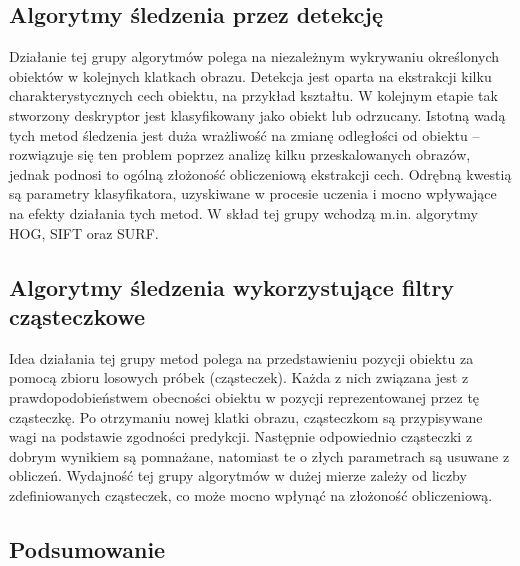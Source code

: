 \subsection{Algorytmy śledzenia przez detekcję}
Działanie tej grupy algorytmów polega na niezależnym wykrywaniu określonych obiektów w kolejnych klatkach obrazu. Detekcja jest oparta na ekstrakcji kilku charakterystycznych cech obiektu, na przykład kształtu. W kolejnym etapie tak stworzony deskryptor jest klasyfikowany jako obiekt lub odrzucany. Istotną wadą tych metod śledzenia jest duża wrażliwość na zmianę odległości od obiektu -- rozwiązuje się ten problem poprzez analizę kilku przeskalowanych obrazów, jednak podnosi to ogólną złożoność obliczeniową ekstrakcji cech. Odrębną kwestią są parametry klasyfikatora, uzyskiwane w procesie uczenia i mocno wpływające na efekty działania tych metod.
W skład tej grupy wchodzą m.in. algorytmy HOG, SIFT oraz SURF.

\subsection{Algorytmy śledzenia wykorzystujące filtry cząsteczkowe}
Idea działania tej grupy metod polega na przedstawieniu pozycji obiektu za pomocą zbioru losowych próbek (cząsteczek). Każda z nich związana jest z prawdopodobieństwem obecności obiektu w pozycji reprezentowanej przez tę cząsteczkę. Po otrzymaniu nowej klatki obrazu, cząsteczkom są przypisywane wagi na podstawie zgodności predykcji. Następnie odpowiednio cząsteczki z dobrym wynikiem są pomnażane, natomiast te o złych parametrach są usuwane z obliczeń.
Wydajność tej grupy algorytmów w dużej mierze zależy od liczby zdefiniowanych cząsteczek, co może mocno wpłynąć na złożoność obliczeniową.
\subsection{Podsumowanie}

